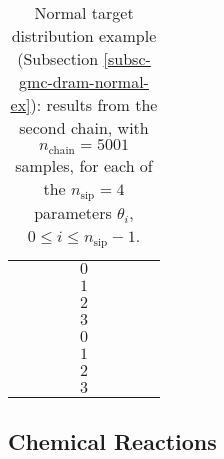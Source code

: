 \begin{table}[h!]
\begin{center}
\begin{tabular}{|c|c|c|c|c|c|c|c|c|}
\hline
\hline
       &          &                        &                        & $0$ &                          &                                &                        &                               \\
\cline{5-9}
       &          &                        &                        & $1$ &                          &                                &                        &                               \\
\cline{5-9}
       &          &                        &                        & $2$ &                          &                                &                        &                               \\
\cline{5-9}
       &          &                        &                        & $3$ &                          &                                &                        &                               \\
\hline
\hline
       &          &                        &                        & $0$ &                          &                                &                        &                               \\
\cline{5-9}
       &          &                        &                        & $1$ &                          &                                &                        &                               \\
\cline{5-9}
       &          &                        &                        & $2$ &                          &                                &                        &                               \\
\cline{5-9}
       &          &                        &                        & $3$ &                          &                                &                        &                               \\
\hline
\end{tabular}
\caption{Normal target distribution example (Subsection \ref{subsc-gmc-dram-normal-ex}):
results from the second chain, with $n_{\text{chain}}=5001$ samples,
for each of the $n_{\text{sip}}=4$ parameters $\theta_i$, $0\leqslant i\leqslant n_{\text{sip}}-1$.
}
\label{tab-dram-normal-ex-results-2}
\end{center}
\end{table}

\subsection{Chemical Reactions}\label{subsc-gmc-dram-chem-ex}

